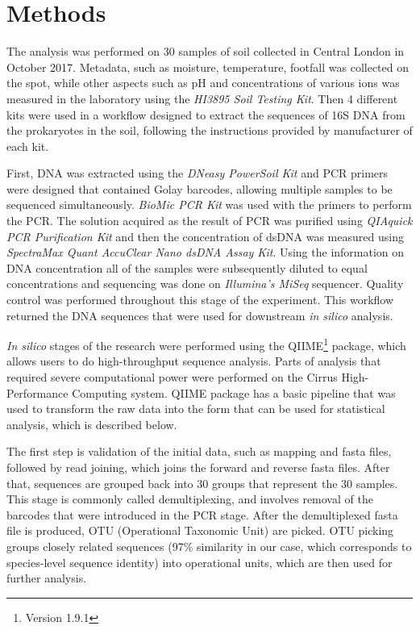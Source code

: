 \documentclass[12pt,twocolumn]{article} %
\begin{document}
\section{Methods}
The analysis was performed on 30 samples of soil collected in Central London in October 2017.  Metadata, such as moisture, temperature, footfall was collected on the spot, while other aspects such as pH and concentrations of various ions was measured in the laboratory using the \textit{HI3895 Soil Testing Kit}. Then 4 different kits were used in a workflow designed to extract the sequences of 16S DNA from the prokaryotes in the soil, following the instructions provided by manufacturer of each kit.
\par
First, DNA was extracted using the \textit{DNeasy PowerSoil Kit} and PCR primers were designed that contained Golay barcodes, allowing multiple samples to be sequenced simultaneously. \textit{BioMic PCR Kit} was used with the primers to perform the PCR. The solution acquired as the result of PCR was purified using \textit{QIAquick PCR Purification Kit} and then the concentration of dsDNA was measured using \textit{SpectraMax Quant AccuClear Nano dsDNA Assay Kit}. Using the information on DNA concentration all of the samples were subsequently diluted to equal concentrations and sequencing was done on \textit{Illumina's MiSeq} sequencer. Quality control was performed throughout this stage of the experiment. This workflow returned the DNA sequences that were used for downstream \textit{in silico} analysis.
\par
\textit{In silico} stages of the research were performed using the QIIME\footnote{Version 1.9.1} package\cite{Caporaso2010,Kuczynski2012}, which allows users to do high-throughput sequence analysis. Parts of analysis that required severe computational power were performed on the Cirrus High-Performance Computing system. QIIME package has a basic pipeline that was used to transform the raw data into the form that can be used for statistical analysis, which is described below.
\par
The first step is validation of the initial data, such as mapping and fasta files, followed by read joining, which joins the forward and reverse fasta files. After that, sequences are grouped back into 30 groups that represent the 30 samples. This stage is commonly called demultiplexing, and involves removal of the barcodes that were introduced in the PCR stage. After the demultiplexed fasta file is produced, OTU (Operational Taxonomic Unit) are picked. OTU picking groups closely related sequences (97\% similarity in our case, which corresponds to species-level sequence identity\cite{STACKEBRANDT1994}) into operational units, which are then used for further analysis.
\end{document}
